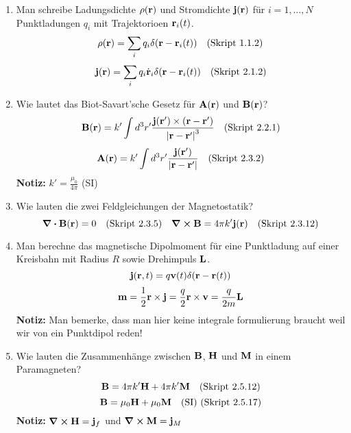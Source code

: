 \documentclass{scrartcl}
\newcommand{\rr}[1]{\frac{#1}{\abs{\vb{r}-\vb{r}'}}}
\newcommand{\ds}{\displaystyle}
\newcommand{\smref}[1]{\quad\text{(Skript #1)}}
\begin{document}
\begin{enumerate}
    \item Man schreibe Ladungsdichte $\rho(\vb r)$ und Stromdichte
          $\vb j(\vb r)$ für $i=1,\ldots,N$ Punktladungen $q_i$ mit 
          Trajektorioen $\vb r_i(t)$.
          $$\rho(\vb r)=\sum_i q_i\delta(\vb r-\vb r_i(t))
          \quad \text{(Skript 1.1.2)}$$
          $$\vb j(\vb r)=\sum_i q_i\dot{\vb r}_i\delta(\vb r-\vb r_i(t))
          \quad \text{(Skript 2.1.2)}$$

    \item Wie lautet das Biot-Savart'sche Gesetz für $\vb A(\vb r)$ und
          $\vb B(\vb r)$?
          $$\vb B(\vb r)=k'\int d^3r'\frac{\vb j(\vb r')\times
          (\vb r-\vb r')}{\abs{\vb r-\vb r'}^3}
          \quad \text{(Skript 2.2.1)}$$
          $$\vb A(\vb r)=k'\int d^3r'\rr{\vb j(\vb r')}
          \quad \text{(Skript 2.3.2)}$$
          \textbf{Notiz:} $k'=\frac{\mu_0}{4\pi}$ (SI)

    \item Wie lauten die zwei Feldgleichungen der Magnetostatik?
      $$\div \vb B(\vb r) = 0\smref{2.3.5}
      \quad \curl \vb B= 4\pi k'\vb j(\vb r)\smref{2.3.12}$$

    \item Man berechne das magnetische Dipolmoment für eine Punktladung auf
          einer Kreisbahn mit Radius $R$ sowie Drehimpuls $\vb L$.
          $$\vb j(\vb r,t)=q\vb v(t)\delta(\vb r-\vb r(t))$$
          $$\vb m = \frac{1}{2}\vb r \times \vb j=\frac{q}{2}\vb 
          r\times\vb v=\frac{q}{2m}\vb L$$
          \textbf{Notiz:} Man bemerke, dass man hier keine integrale 
          formulierung braucht weil wir von ein Punktdipol reden!

    \item Wie lauten die Zusammenhänge zwischen $\vb B$, $\vb H$ 
          und $\vb M$ in einem Paramagneten?
          $$\vb B = 4\pi k'\vb H + 4\pi k'\vb M\quad\text{(Skript 2.5.12)}$$
          $$\vb B = \mu_0 \vb H + \mu_0 \vb M \quad\text{(SI) 
          (Skript 2.5.17)}$$
          \textbf{Notiz:} $\ds \curl \vb H = \vb j_f$ und 
          $\ds \curl \vb M=\vb j_M$ 
  \end{enumerate}
  \newpage
\end{document}
